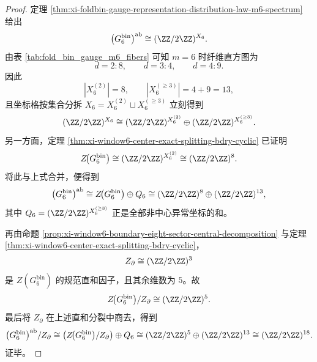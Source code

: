 \begin{proof}
定理 \ref{thm:xi-foldbin-gauge-representation-distribution-law-m6-spectrum} 给出
\[
\bigl(G_6^{\mathrm{bin}}\bigr)^{\mathrm{ab}}
\cong
(\ZZ/2\ZZ)^{X_6}.
\]
由表 \ref{tab:fold_bin_gauge_m6_fibers} 可知 \(m=6\) 时纤维直方图为
\[
d=2:8,\qquad d=3:4,\qquad d=4:9.
\]
因此
\[
|X_6^{(2)}|=8,
\qquad
|X_6^{(\ge 3)}|=4+9=13,
\]
且坐标格按集合分拆 \(X_6=X_6^{(2)}\sqcup X_6^{(\ge 3)}\) 立刻得到
\[
(\ZZ/2\ZZ)^{X_6}
\cong
(\ZZ/2\ZZ)^{X_6^{(2)}}
\oplus
(\ZZ/2\ZZ)^{X_6^{(\ge 3)}}.
\]
另一方面，定理 \ref{thm:xi-window6-center-exact-splitting-bdry-cyclic} 已证明
\[
Z\!\bigl(G_6^{\mathrm{bin}}\bigr)
\cong
(\ZZ/2\ZZ)^{X_6^{(2)}}
\cong
(\ZZ/2\ZZ)^8.
\]
将此与上式合并，便得到
\[
\bigl(G_6^{\mathrm{bin}}\bigr)^{\mathrm{ab}}
\cong
Z\!\bigl(G_6^{\mathrm{bin}}\bigr)\oplus Q_6
\cong
(\ZZ/2\ZZ)^8\oplus(\ZZ/2\ZZ)^{13},
\]
其中 \(Q_6=(\ZZ/2\ZZ)^{X_6^{(\ge 3)}}\) 正是全部非中心异常坐标的和。
\par
再由命题 \ref{prop:xi-window6-boundary-eight-sector-central-decomposition} 与定理 \ref{thm:xi-window6-center-exact-splitting-bdry-cyclic}，
\[
Z_{\partial}\cong (\ZZ/2\ZZ)^3
\]
是 \(Z(G_6^{\mathrm{bin}})\) 的规范直和因子，且其余维数为 \(5\)。故
\[
Z\!\bigl(G_6^{\mathrm{bin}}\bigr)/Z_{\partial}\cong (\ZZ/2\ZZ)^5.
\]
最后将 \(Z_{\partial}\) 在上述直和分裂中商去，得到
\[
\bigl(G_6^{\mathrm{bin}}\bigr)^{\mathrm{ab}}/Z_{\partial}
\cong
\left(Z\!\bigl(G_6^{\mathrm{bin}}\bigr)/Z_{\partial}\right)\oplus Q_6
\cong
(\ZZ/2\ZZ)^5\oplus(\ZZ/2\ZZ)^{13}
\cong
(\ZZ/2\ZZ)^{18}.
\]
证毕。
\end{proof}



\endinput
